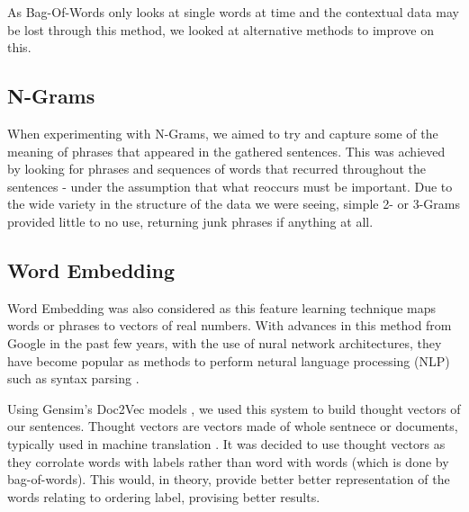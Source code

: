 \documentclass[bsc,frontabs,twoside,singlespacing,parskip,deptreport]{infthesis}     %
\begin{document}
As Bag-Of-Words only looks at single words at time and the contextual data may be lost through this method, we looked at
alternative methods to improve on this.

\subsection{N-Grams}
When experimenting with N-Grams, we aimed to try and capture some of the meaning of phrases that appeared in the gathered
sentences.
This was achieved by looking for phrases and sequences of words that recurred throughout the sentences - under the assumption
that what reoccurs must be important. Due to the wide variety in the structure of the data we were seeing,
simple 2- or 3-Grams provided little to no use, returning junk phrases if anything at all.





\subsection{Word Embedding} \label{sec:word-embedding}
Word Embedding was also considered as this feature learning technique maps words or phrases to vectors of real numbers.
With advances in this method from Google in the past few years, with the use of nural network architectures, they have become
popular as methods to perform netural language processing (NLP) such as syntax parsing \cite{socher2013parsing}.

Using Gensim's Doc2Vec models \cite{rehurek_lrec}, we used this system to build thought vectors of our sentences.
Thought vectors are vectors made of whole sentnece or documents, typically used in machine translation \cite{deeplearning4j}.
It was decided to use thought vectors as they corrolate words with labels rather than word with words (which is done by bag-of-words).
This would, in theory, provide better better representation of the words relating to ordering label, provising better results.
\end{document}
